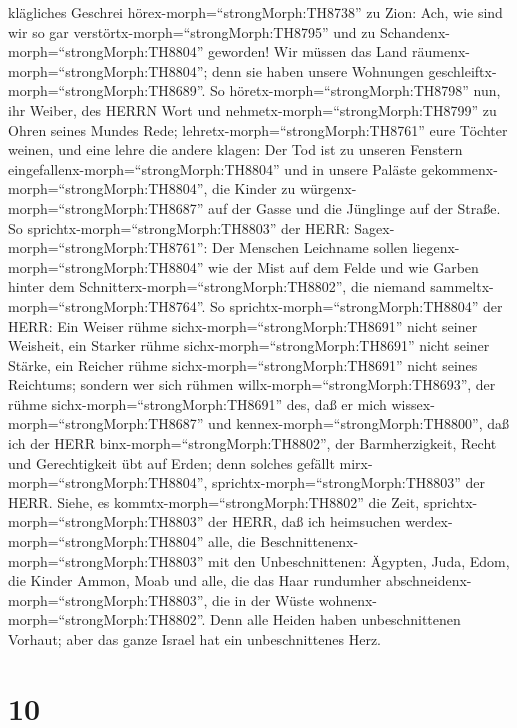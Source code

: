 klägliches Geschrei hörex-morph=``strongMorph:TH8738'' zu Zion: Ach, wie
sind wir so gar verstörtx-morph=``strongMorph:TH8795'' und zu
Schandenx-morph=``strongMorph:TH8804'' geworden! Wir müssen das Land
räumenx-morph=``strongMorph:TH8804''; denn sie haben unsere Wohnungen
geschleiftx-morph=``strongMorph:TH8689''.  So
höretx-morph=``strongMorph:TH8798'' nun, ihr Weiber, des HERRN Wort und
nehmetx-morph=``strongMorph:TH8799'' zu Ohren seines Mundes Rede;
lehretx-morph=``strongMorph:TH8761'' eure Töchter weinen, und eine lehre
die andere klagen:  Der Tod ist zu unseren Fenstern
eingefallenx-morph=``strongMorph:TH8804'' und in unsere Paläste
gekommenx-morph=``strongMorph:TH8804'', die Kinder zu
würgenx-morph=``strongMorph:TH8687'' auf der Gasse und die Jünglinge auf
der Straße.  So sprichtx-morph=``strongMorph:TH8803'' der
HERR: Sagex-morph=``strongMorph:TH8761'': Der Menschen Leichname sollen
liegenx-morph=``strongMorph:TH8804'' wie der Mist auf dem Felde und wie
Garben hinter dem Schnitterx-morph=``strongMorph:TH8802'', die niemand
sammeltx-morph=``strongMorph:TH8764''.  So
sprichtx-morph=``strongMorph:TH8804'' der HERR: Ein Weiser rühme
sichx-morph=``strongMorph:TH8691'' nicht seiner Weisheit, ein Starker
rühme sichx-morph=``strongMorph:TH8691'' nicht seiner Stärke, ein
Reicher rühme sichx-morph=``strongMorph:TH8691'' nicht seines Reichtums;
 sondern wer sich rühmen
willx-morph=``strongMorph:TH8693'', der rühme
sichx-morph=``strongMorph:TH8691'' des, daß er mich
wissex-morph=``strongMorph:TH8687'' und
kennex-morph=``strongMorph:TH8800'', daß ich der HERR
binx-morph=``strongMorph:TH8802'', der Barmherzigkeit, Recht und
Gerechtigkeit übt auf Erden; denn solches gefällt
mirx-morph=``strongMorph:TH8804'', sprichtx-morph=``strongMorph:TH8803''
der HERR.  Siehe, es kommtx-morph=``strongMorph:TH8802''
die Zeit, sprichtx-morph=``strongMorph:TH8803'' der HERR, daß ich
heimsuchen werdex-morph=``strongMorph:TH8804'' alle, die
Beschnittenenx-morph=``strongMorph:TH8803'' mit den Unbeschnittenen:
 Ägypten, Juda, Edom, die Kinder Ammon, Moab und alle, die
das Haar rundumher abschneidenx-morph=``strongMorph:TH8803'', die in der
Wüste wohnenx-morph=``strongMorph:TH8802''. Denn alle Heiden haben
unbeschnittenen Vorhaut; aber das ganze Israel hat ein unbeschnittenes
Herz.

\hypertarget{section-9}{%
\section{10}\label{section-9}}

